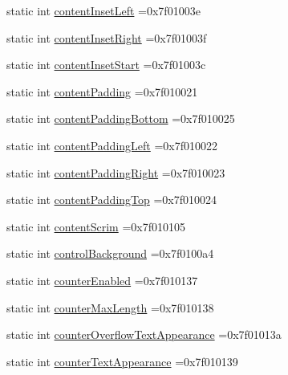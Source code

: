 \begin{DoxyCompactItemize}
\item 
static int \hyperlink{classandroid_1_1support_1_1v7_1_1appcompat_1_1R_1_1attr_a53c50cac162dcc7adf7d93be2d2bce5c}{content\+Inset\+Left} =0x7f01003e
\item 
static int \hyperlink{classandroid_1_1support_1_1v7_1_1appcompat_1_1R_1_1attr_a608654504a7bff330119bfa1462d385a}{content\+Inset\+Right} =0x7f01003f
\item 
static int \hyperlink{classandroid_1_1support_1_1v7_1_1appcompat_1_1R_1_1attr_a24763fb35393b1e0a6c6b9057f47fc22}{content\+Inset\+Start} =0x7f01003c
\item 
static int \hyperlink{classandroid_1_1support_1_1v7_1_1appcompat_1_1R_1_1attr_ac9b82d0a6109c603a1761c5f3da4c700}{content\+Padding} =0x7f010021
\item 
static int \hyperlink{classandroid_1_1support_1_1v7_1_1appcompat_1_1R_1_1attr_a6c80b197ceddf31edc9ed8d675a89ea4}{content\+Padding\+Bottom} =0x7f010025
\item 
static int \hyperlink{classandroid_1_1support_1_1v7_1_1appcompat_1_1R_1_1attr_a25b1ff2e90eb5c1effb27911fb561ae7}{content\+Padding\+Left} =0x7f010022
\item 
static int \hyperlink{classandroid_1_1support_1_1v7_1_1appcompat_1_1R_1_1attr_a28810441733d8d355aaacfc0a5513bf8}{content\+Padding\+Right} =0x7f010023
\item 
static int \hyperlink{classandroid_1_1support_1_1v7_1_1appcompat_1_1R_1_1attr_ad487afb8843c5c747a98ac877c051665}{content\+Padding\+Top} =0x7f010024
\item 
static int \hyperlink{classandroid_1_1support_1_1v7_1_1appcompat_1_1R_1_1attr_ab524c966b3d2b0e493bd1b4a72aca159}{content\+Scrim} =0x7f010105
\item 
static int \hyperlink{classandroid_1_1support_1_1v7_1_1appcompat_1_1R_1_1attr_a901159731928d4261753b4ae386d60e3}{control\+Background} =0x7f0100a4
\item 
static int \hyperlink{classandroid_1_1support_1_1v7_1_1appcompat_1_1R_1_1attr_a511b4c603ffb630488d846e3e750d2eb}{counter\+Enabled} =0x7f010137
\item 
static int \hyperlink{classandroid_1_1support_1_1v7_1_1appcompat_1_1R_1_1attr_a3ac08d5d35fcfeb3c8d8166422cce804}{counter\+Max\+Length} =0x7f010138
\item 
static int \hyperlink{classandroid_1_1support_1_1v7_1_1appcompat_1_1R_1_1attr_a413f70c3f970308cb81b4d96766b3a20}{counter\+Overflow\+Text\+Appearance} =0x7f01013a
\item 
static int \hyperlink{classandroid_1_1support_1_1v7_1_1appcompat_1_1R_1_1attr_a86b164196b84bd8f7b817acc52c5fba9}{counter\+Text\+Appearance} =0x7f010139

\end{DoxyCompactItemize}
